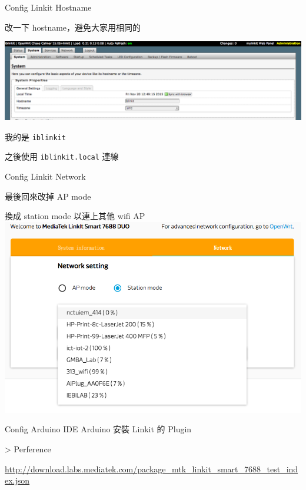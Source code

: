 \documentclass{beamer}
\begin{document}
\begin{frame}[fragile]{Config Linkit Hostname}
  \Large
  \begin{center}
    改一下 hostname，避免大家用相同的
  \end{center}

  \includegraphics[scale=0.25]{./img/hostname.png}

  \begin{center}
    我的是 \verb`iblinkit`

    之後使用 \verb`iblinkit.local` 連線
  \end{center}
\end{frame}

\begin{frame}{Config Linkit Network}
  \Large
  \begin{center}
    最後回來改掉 AP mode

    換成 station mode 以連上其他 wifi AP
    \includegraphics[scale=0.3]{./img/connect_wifi.png}
  \end{center}
\end{frame}

\begin{frame}{Config Arduino IDE}
  \Large
  Arduino 安裝 Linkit 的 Plugin

  > Perference

  \small
  \url{http://download.labs.mediatek.com/package_mtk_linkit_smart_7688_test_index.json}
\end{frame}
\end{document}
